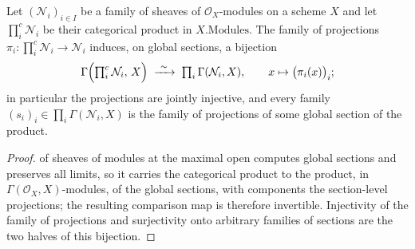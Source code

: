 \begin{lemma}
  \label{mk-lem:gamma_pi_sections}
  \leanok
  Let \((\mathcal N_i)_{i \in I}\) be a family of sheaves of
  \(\mathcal O_X\)-modules on a scheme \(X\) and let
  \(\textstyle\prod^{c}_i \mathcal N_i\) be their categorical product in
  \(X.\mathrm{Modules}\). The family of projections
  \(\pi_i : \prod^{c}_i \mathcal N_i \to \mathcal N_i\) induces, on global
  sections, a bijection
  \[
    \Gamma\Bigl(\textstyle\prod^{c}_i \mathcal N_i,\, X\Bigr)
      \;\xrightarrow{\ \sim\ }\; \prod_i \Gamma(\mathcal N_i, X), \qquad
    x \mapsto \bigl(\pi_i(x)\bigr)_i;
  \]
  in particular the projections are jointly injective, and every family
  \((s_i)_i \in \prod_i \Gamma(\mathcal N_i, X)\) is the family of
  projections of some global section of the product.
\end{lemma}
\begin{proof}
  \leanokEvaluation of sheaves of modules at the maximal open computes global
  sections and preserves all limits, so it carries the categorical product
  to the product, in \(\Gamma(\mathcal O_X, X)\)-modules, of the global
  sections, with components the section-level projections; the resulting
  comparison map is therefore invertible. Injectivity of the family of
  projections and surjectivity onto arbitrary families of sections are the
  two halves of this bijection.
\end{proof}

